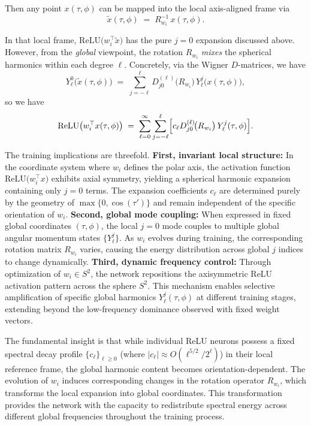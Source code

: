 \documentclass[review,onefignum,onetabnum,onealgnum]{siamart250106}
\numberwithin{theorem}{section}
\begin{document}
Then any point $x(\tau,\phi)$ can be mapped into the local 
axis-aligned frame via
\[
\tilde{x}(\tau,\phi) 
\;=\;
R_{w_i}^{-1}\,x(\tau,\phi).
\]

In that local frame, $\mathrm{ReLU}\bigl(w_i^\top \tilde{x}\bigr)$ has the pure $j=0$ expansion 
discussed above.  However, from the \emph{global} viewpoint, the rotation $R_{w_i}$ \emph{mixes} the 
spherical harmonics within each degree $\ell$.  Concretely, via the Wigner $D$-matrices, we have
\[
Y_{\ell}^0\bigl(\tilde{x}(\tau,\phi)\bigr)
\;=\;
\sum_{j=-\ell}^{\ell}
D_{j0}^{(\ell)}\bigl(R_{w_i}\bigr)
\,Y_{\ell}^j\bigl(x(\tau,\phi)\bigr),
\]
so we have
\begin{equation}\label{reluglobalform}
    \mathrm{ReLU}\bigl(w_i^\top x(\tau,\phi)\bigr)
\;=\;
\sum_{\ell=0}^{\infty}\sum_{j=-\ell}^{\ell}
\Bigl[
c_{\ell}
D_{j0}^{(\ell)}\!\bigl(R_{w_i}\bigr)
\,Y_{\ell}^j(\tau,\phi)
\Bigr].
\end{equation}


The training implications are threefold. \textbf{First, invariant local structure:} In the coordinate system where $w_i$ defines the polar axis, the activation function $\mathrm{ReLU}\!\bigl(w_i^\top x\bigr)$ exhibits axial symmetry, yielding a spherical harmonic expansion containing only $j=0$ terms. The expansion coefficients $c_{\ell}$ are determined purely by the geometry of $\max\{0,\cos(\tau')\}$ and remain independent of the specific orientation of $w_i$. \textbf{Second, global mode coupling:} When expressed in fixed global coordinates $(\tau,\phi)$, the local $j=0$ mode couples to multiple global angular momentum states $\{Y_{\ell}^j\}$. As $w_i$ evolves during training, the corresponding rotation matrix $R_{w_i}$ varies, causing the energy distribution across global $j$ indices to change dynamically. \textbf{Third, dynamic frequency control:} Through optimization of $w_i\in S^2$, the network repositions the axisymmetric $\mathrm{ReLU}$ activation pattern across the sphere $S^2$. This mechanism enables selective amplification of specific global harmonics $Y_{\ell}^j(\tau,\phi)$ at different training stages, extending beyond the low-frequency dominance observed with fixed weight vectors.

The fundamental insight is that while individual ReLU neurons possess a fixed 
spectral decay profile $\{c_{\ell}\}_{\ell\ge0}$ (where $|c_{\ell}|\approx O(\ell^{5/2}/2^\ell)$) 
in their local reference frame, the global harmonic content becomes orientation-dependent. 
The evolution of $w_i$ induces corresponding changes in the rotation operator $R_{w_i}$, 
which transforms the local expansion into global coordinates. This transformation 
provides the network with the capacity to redistribute spectral energy across 
different global frequencies throughout the training process.
\end{document}
